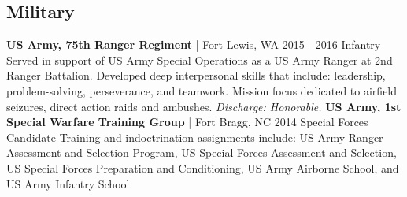 \documentclass{article}
\begin{document}
\begin{bgbox}[
        height = \paperheight,
        width = 0.69\textwidth,
        colback = white
    ]
{            \section*{Military}
                \textbf{US Army, 75th Ranger Regiment} | Fort Lewis, WA \hfill{2015 - 2016}\newline
                        Infantry\newline\newline
                            Served in support of US Army Special Operations as a US Army Ranger at 2nd Ranger Battalion. Developed deep interpersonal skills that include: leadership, problem-solving, perseverance, and teamwork. Mission focus dedicated to airfield seizures, direct action raids and ambushes. \textit{Discharge: Honorable.}\newline\newline
                \textbf{US Army, 1st Special Warfare Training Group} | Fort Bragg, NC \hfill{2014}\newline
                        Special Forces Candidate\newline\newline
                            Training and indoctrination assignments include: US Army Ranger Assessment and Selection Program, US Special Forces Assessment and Selection, US Special Forces Preparation and Conditioning, US Army Airborne School, and US Army Infantry School.\newline
            \mbox{}
            \vfill
        }
    \end{bgbox}
\end{document}
